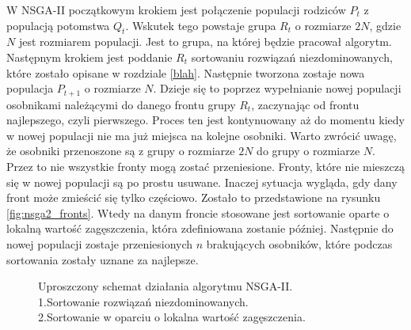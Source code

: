 \documentclass[twoside]{iisthesis}
\begin{document}
W NSGA-II początkowym krokiem jest połączenie populacji rodziców $P_{t}$ z populacją potomstwa $Q_{t}$. Wskutek tego powstaje grupa $R_{t}$ o rozmiarze $2N$, gdzie $N$ jest rozmiarem populacji. Jest to grupa, na której będzie pracował algorytm. Następnym krokiem jest poddanie $R_{t}$ sortowaniu rozwiązań niezdominowanych, które zostało opisane w rozdziale \ref{blah}. Następnie tworzona zostaje nowa populacja $P_{t+1}$ o rozmiarze $N$. Dzieje się to poprzez wypełnianie nowej populacji osobnikami należącymi do danego frontu grupy $R_{t}$, zaczynając od frontu najlepszego, czyli pierwszego. Proces ten jest kontynuowany aż do momentu kiedy w nowej populacji nie ma już miejsca na kolejne osobniki. Warto zwrócić uwagę, że osobniki przenoszone są z grupy o rozmiarze $2N$ do grupy o rozmiarze $N$. Przez to nie wszystkie fronty mogą zostać przeniesione. Fronty, które nie mieszczą się w nowej populacji są po prostu usuwane. Inaczej sytuacja wygląda, gdy dany front może zmieścić się tylko częściowo. Zostało to przedstawione na rysunku \eqref{fig:nsga2_fronts}. Wtedy na danym froncie stosowane jest sortowanie oparte o lokalną wartość zagęszczenia, która zdefiniowana zostanie później. Następnie do nowej populacji zostaje przeniesionych $n$ brakujących osobników, które podczas sortowania zostały uznane za najlepsze.
\begin{figure}[!htb]
	\centering
	\caption{Uproszczony schemat działania algorytmu NSGA-II.\\1.Sortowanie rozwiązań niezdominowanych.\\2.Sortowanie w oparciu o lokalna wartość zagęszczenia.}
	\label{fig:nsga2_fronts}
\end{figure}
\end{document}
